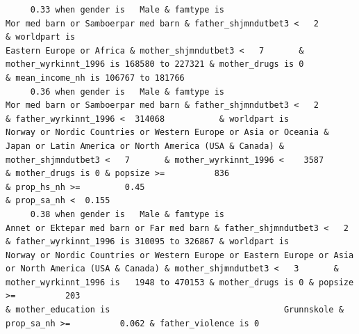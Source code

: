 \documentclass[
  letterpaper,
  DIV=11,
  numbers=noendperiod]{scrreprt}
\begin{document}
\begin{verbatim}
     0.33 when gender is   Male & famtype is                              Mor med barn or Samboerpar med barn & father_shjmndutbet3 <   2                                                  & worldpart is                                                                                                            Eastern Europe or Africa & mother_shjmndutbet3 <   7       & mother_wyrkinnt_1996 is 168580 to 227321 & mother_drugs is 0                                                         & mean_income_nh is 106767 to 181766                                                                                                                                                                                                                                                                                                                                            
     0.36 when gender is   Male & famtype is                              Mor med barn or Samboerpar med barn & father_shjmndutbet3 <   2       & father_wyrkinnt_1996 <  314068           & worldpart is            Norway or Nordic Countries or Western Europe or Asia or Oceania & Japan or Latin America or North America (USA & Canada) & mother_shjmndutbet3 <   7       & mother_wyrkinnt_1996 <    3587           & mother_drugs is 0 & popsize >=          836                                                                    & prop_hs_nh >=         0.45                                                                                                                                           & prop_sa_nh <  0.155                                                                                                                                               
     0.38 when gender is   Male & famtype is                        Annet or Ektepar med barn or Far med barn & father_shjmndutbet3 <   2       & father_wyrkinnt_1996 is 310095 to 326867 & worldpart is                              Norway or Nordic Countries or Western Europe or Eastern Europe or Asia or North America (USA & Canada) & mother_shjmndutbet3 <   3       & mother_wyrkinnt_1996 is   1948 to 470153 & mother_drugs is 0 & popsize >=          203                                                                                                                                                                        & mother_education is                                   Grunnskole & prop_sa_nh >=          0.062 & father_violence is 0                                                                                                               

\end{verbatim}
\end{document}
